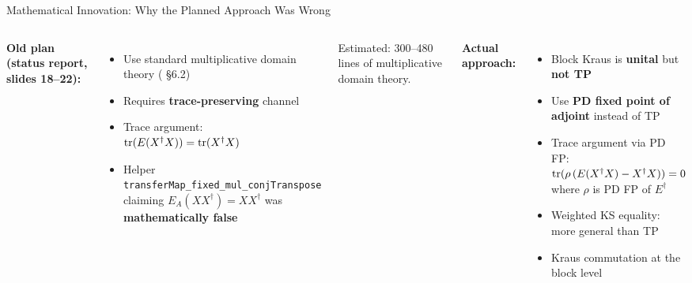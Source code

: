 \documentclass[aspectratio=169,10pt]{beamer}
\begin{document}
\begin{frame}{Mathematical Innovation: Why the Planned Approach Was Wrong}
    \vspace{-0.5em}

    \begin{columns}[T]
        \textbf{\textcolor{softred}{Old plan} (status report, slides 18--22):}
        \begin{itemize}\itemsep0.1em\small
            \item[\textcolor{softred}{$\times$}] Use standard multiplicative domain theory (\cite{Wolf2012Quantum} \S6.2)
            \item[\textcolor{softred}{$\times$}] Requires \textbf{trace-preserving} channel
            \item[\textcolor{softred}{$\times$}] Trace argument: $\mathrm{tr}(E(X^\dagger X)) = \mathrm{tr}(X^\dagger X)$
            \item[\textcolor{softred}{$\times$}] Helper \texttt{transferMap\_fixed\_mul\_conjTranspose} claiming $E_A(XX^\dagger) = XX^\dagger$ was \textbf{mathematically false}
        \end{itemize}

        \vspace{0.2em}
        {\scriptsize\textcolor{dimwhite}{Estimated: 300--480 lines of multiplicative domain theory.}}

        \textbf{\textcolor{leangreen}{Actual approach:}}
        \begin{itemize}\itemsep0.1em\small
            \item[\textcolor{leangreen}{\checkmark}] Block Kraus is \textbf{unital} but \textbf{not TP}
            \item[\textcolor{leangreen}{\checkmark}] Use \textbf{PD fixed point of adjoint} instead of TP
            \item[\textcolor{leangreen}{\checkmark}] Trace argument via PD FP:\\
                {\scriptsize $\mathrm{tr}(\rho\,(E(X^\dagger X) - X^\dagger X)) = 0$ where $\rho$ is PD FP of $E^\dagger$}
            \item[\textcolor{leangreen}{\checkmark}] Weighted KS equality: more general than TP
            \item[\textcolor{leangreen}{\checkmark}] Kraus commutation at the block level
        \end{itemize}


\end{columns}
\end{frame}
\end{document}
